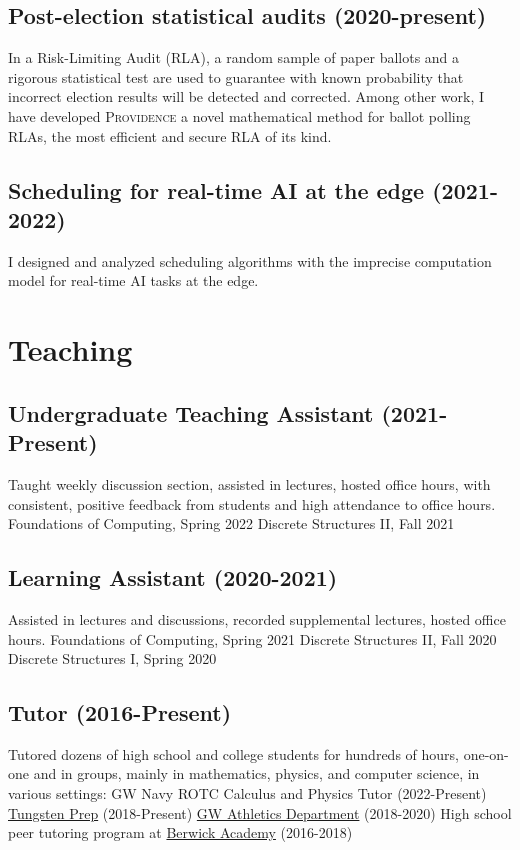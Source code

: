 \documentclass[letterpaper]{article}
\newcommand{\Providence}{\textsc{Providence}\xspace}
\begin{document}
\subsection*{Post-election statistical audits (2020-present)}
In a Risk-Limiting Audit (RLA), a random sample of paper ballots and a rigorous statistical test are used to guarantee with known probability that incorrect election results will be detected and corrected.
Among other work, I have developed \Providence a novel mathematical method for ballot polling RLAs, the most efficient and secure RLA of its kind.

\subsection*{Scheduling for real-time AI at the edge (2021-2022)}
I designed and analyzed scheduling algorithms with the imprecise computation model for real-time AI tasks at the edge. 

\section*{Teaching}
\subsection*{Undergraduate Teaching Assistant (2021-Present)}
Taught weekly discussion section, assisted in lectures, hosted office hours, with consistent, positive feedback from students and high attendance to office hours.
\subitem
Foundations of Computing, Spring 2022
\subitem
Discrete Structures II, Fall 2021
\subsection*{Learning Assistant (2020-2021)}
Assisted in lectures and discussions, recorded supplemental lectures, hosted office hours.
\subitem
Foundations of Computing, Spring 2021
\subitem
Discrete Structures II, Fall 2020
\subitem
Discrete Structures I, Spring 2020
\subsection*{Tutor (2016-Present)}
Tutored dozens of high school and college students for hundreds of hours, one-on-one and in groups, mainly in mathematics, physics, and computer science, in various settings:
\subitem 
GW Navy ROTC Calculus and Physics Tutor (2022-Present)
\subitem
\href{https://www.tungstenprep.com/}{Tungsten Prep} (2018-Present) 
\subitem
\href{https://gwsports.com/sports/2018/7/23/school-bio-academic-support-tutor-info-html.aspx}{GW Athletics Department} (2018-2020) 
\subitem 
High school peer tutoring program at \href{https://www.berwickacademy.org/}{Berwick Academy} (2016-2018)
\end{document}
